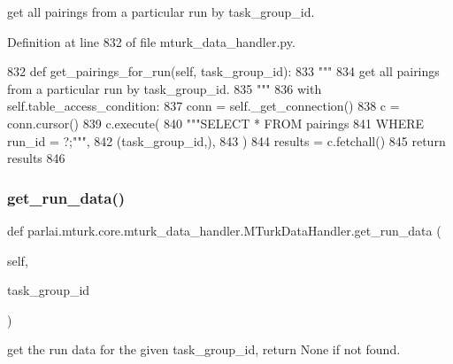 \begin{DoxyVerb}get all pairings from a particular run by task_group_id.
\end{DoxyVerb}
 

Definition at line 832 of file mturk\+\_\+data\+\_\+handler.\+py.


\begin{DoxyCode}
832     \textcolor{keyword}{def }get\_pairings\_for\_run(self, task\_group\_id):
833         \textcolor{stringliteral}{"""}
834 \textcolor{stringliteral}{        get all pairings from a particular run by task\_group\_id.}
835 \textcolor{stringliteral}{        """}
836         with self.table\_access\_condition:
837             conn = self.\_get\_connection()
838             c = conn.cursor()
839             c.execute(
840                 \textcolor{stringliteral}{"""SELECT * FROM pairings}
841 \textcolor{stringliteral}{                         WHERE run\_id = ?;"""},
842                 (task\_group\_id,),
843             )
844             results = c.fetchall()
845             \textcolor{keywordflow}{return} results
846 
\end{DoxyCode}
\mbox{\label{classparlai_1_1mturk_1_1core_1_1mturk__data__handler_1_1MTurkDataHandler_a3ded92bcc9f19027c452489e2b06d837}} 
\subsubsection{\texorpdfstring{get\+\_\+run\+\_\+data()}{get\_run\_data()}}
{\footnotesize\ttfamily def parlai.\+mturk.\+core.\+mturk\+\_\+data\+\_\+handler.\+M\+Turk\+Data\+Handler.\+get\+\_\+run\+\_\+data (\begin{DoxyParamCaption}\item[{}]{self,  }\item[{}]{task\+\_\+group\+\_\+id }\end{DoxyParamCaption})}

\begin{DoxyVerb}get the run data for the given task_group_id, return None if not found.
\end{DoxyVerb}
 

